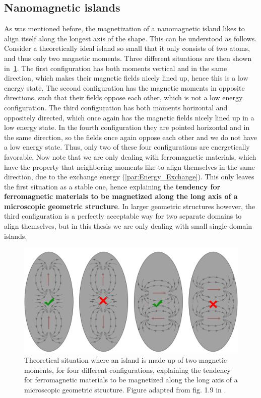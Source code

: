 \documentclass[10pt,a4paper]{article}
\begin{document}
\subsection{Nanomagnetic islands}
As was mentioned before, the magnetization of a nanomagnetic island likes to align itself along the longest axis of the shape. This can be understood as follows. Consider a theoretically ideal island so small that it only consists of two atoms, and thus only two magnetic moments. Three different situations are then shown in~\cref{fig:Intro_IslandEllipticPreferredDirection}.
The first configuration has both moments vertical and in the same direction, which makes their magnetic fields nicely lined up, hence this is a low energy state. The second configuration has the magnetic moments in opposite directions, such that their fields oppose each other, which is not a low energy configuration. The third configuration has both moments horizontal and oppositely directed, which once again has the magnetic fields nicely lined up in a low energy state. In the fourth configuration they are pointed horizontal and in the same direction, so the fields once again oppose each other and we do not have a low energy state. Thus, only two of these four configurations are energetically favorable. Now note that we are only dealing with ferromagnetic materials, which have the property that neighboring moments like to align themselves in the same direction, due to the exchange energy (\cref{par:Energy_Exchange}). This only leaves the first situation as a stable one, hence explaining the \textbf{tendency for ferromagnetic materials to be magnetized along the long axis of a microscopic geometric structure}. In larger geometric structures however, the third configuration is a perfectly acceptable way for two separate domains to align themselves, but in this thesis we are only dealing with small single-domain islands. \par
\begin{figure}[t]
    \centering
    \includegraphics[width=0.9\columnwidth]{Figures/Introduction/NML_Carlton - Figure 1.9 adapted.png}
    \caption{Theoretical situation where an island is made up of two magnetic moments, for four different configurations, explaining the tendency for ferromagnetic materials to be magnetized along the long axis of a microscopic geometric structure. Figure adapted from fig. 1.9 in \cite{NML_Carlton}.}
    \label{fig:Intro_IslandEllipticPreferredDirection}
\end{figure}
\end{document}
